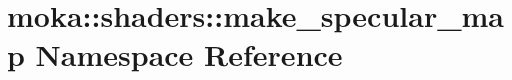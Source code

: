 \hypertarget{namespacemoka_1_1shaders_1_1make__specular__map}{}\section{moka\+::shaders\+::make\+\_\+specular\+\_\+map Namespace Reference}
\label{namespacemoka_1_1shaders_1_1make__specular__map}
